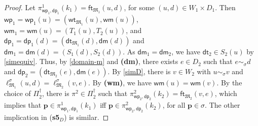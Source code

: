 \documentclass[10pt,a4paper]{amsart}
\theoremstyle{plain}
\theoremstyle{definition}
\newcommand{\wt}{\mathsf{wt}}
\newcommand{\dt}{\mathsf{dt}}
\newcommand{\ft}{\mathsf{ft}}
\newcommand{\wm}{\mathsf{wm}}
\newcommand{\dm}{\mathsf{dm}}
\newcommand{\iwp}{\mathsf{wp}_i}
\newcommand{\idp}{\mathsf{dp}_i}
\newcommand{\owp}{\mathsf{wp}_1}
\newcommand{\twp}{\mathsf{wp}_2}
\newcommand{\odp}{\mathsf{dp}_1}
\newcommand{\tdp}{\mathsf{dp}_2}
\newcommand{\fform}[1]{\boldsymbol{#1}}
\newcommand{\pvar}{\fform{p}}
\begin{document}
\begin{proof}
	Let $\pi^1_{\owp,\odp}(k_1) = \ft_{\mathfrak{M}_{1}}(u,d)$, for some $(u,d)\in W_{1} \times D_{1}$. Then $\owp = \owp(u) = (\wt_{\mathfrak M_1}(u), \wm(u) )$, $\wm_1 = \wm(u) = (T_1(u), T_2(u))$, and $\odp = \odp(d) = (\dt_{\mathfrak M_1}(d), \dm(d) )$ and $\dm_1 = \dm(d) = (S_1(d), S_2(d))$. 
As $\dm_1 = \dm_2$, we have $\dt_2 \in S_2(u)$ by \eqref{simequiv}. Thus, by \eqref{domain-m} and  {\bf (dm)}, 
	there exists $e \in D_{2}$ such that $e\sim_{\sigma} d$ and $\tdp = (\dt_{\mathfrak M_2}(e), \dm(e) )$.
	By \eqref{simD}, 
	there is $v \in W_2$ with $u \sim_\sigma v$ and $\ell^\sigma_{\mathfrak M_1}(u,d)= \ell^\sigma_{\mathfrak M_2}(v,e)$. By {\bf (wm)}, we have $\wm(u) = \wm(v)$. By the choice of $\Pi_{2}^{\dag}$, there is $\pi^{2}\in \Pi_{2}^{\dag}$ such that $\pi^2_{\twp,\tdp}(k_2) = \ft_{\mathfrak M_2}(v,e)$, which implies that $\pvar \in \pi^1_{\owp,\odp}(k_1)$ iff $\pvar \in \pi^2_{\twp,\tdp}(k_2)$, for all $\pvar \in \sigma$.
	The other implication in (\textbf{s5}$_D$) is similar.
\end{proof}

%
%
%
\end{document}
